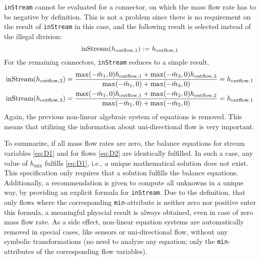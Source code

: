 \lstinline!inStream! cannot be evaluated for a connector, on which the mass flow rate has to be negative by definition.
This is not a problem since there is no requirement on the result of \lstinline!inStream! in this case, and the following result is selected instead of the illegal division:
\begin{equation*}
\text{\lstinline!inStream!}(h_{\mathrm{outflow},1}):=h_{\mathrm{outflow},1}
\end{equation*}
For the remaining connectors, \lstinline!inStream! reduces to a simple result.
\begin{align*}
\text{\lstinline!inStream!}(h_{\mathrm{outflow},2}) &= \frac{\operatorname{max}(-\tilde{m}_1,0)h_{\mathrm{outflow},1}+\operatorname{max}(-\tilde{m}_3,0)h_{\mathrm{outflow},3}}{\operatorname{max}(-\tilde{m}_1,0)+\operatorname{max}(-\tilde{m}_3,0)}
  = h_{\mathrm{outflow},1}\\
\text{\lstinline!inStream!}(h_{\mathrm{outflow},3}) &= \frac{\operatorname{max}(-\tilde{m}_1,0)h_{\mathrm{outflow},1}+\operatorname{max}(-\tilde{m}_2,0)h_{\mathrm{outflow},2}}{\operatorname{max}(-\tilde{m}_1,0)+\operatorname{max}(-\tilde{m}_2,0)}
  = h_{\mathrm{outflow},1}
\end{align*}
Again, the previous non-linear algebraic system of equations is removed.
This means that utilizing the information about uni-directional flow is very important.

To summarize, if all mass flow rates are zero, the balance equations for stream variables \eqref{eq:D1} and for flows \eqref{eq:D2} are identically fulfilled.
In such a case, any value of $h_{\mathrm{mix}}$ fulfills \eqref{eq:D1}, i.e., a unique mathematical solution does not exist.
This specification only requires that a solution fulfills the balance equations.
Additionally, a recommendation is given to compute all unknowns in a unique way, by providing an explicit formula for \lstinline!inStream!.
Due to the definition, that only flows where the corresponding \lstinline!min!-attribute is neither zero nor positive enter this formula, a meaningful physcial result is always obtained, even in case of zero mass flow rate.
As a side effect, non-linear equation systems are automatically removed in special cases, like sensors or uni-directional flow, without any symbolic transformations (no need to analyze any equation; only the \lstinline!min!-attributes of the corresponding flow variables).
